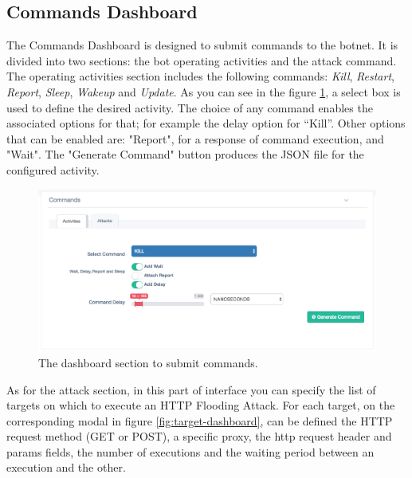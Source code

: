 \subsection{Commands Dashboard}\label{sec:commands-dashboard}
The Commands Dashboard is designed to submit commands to the botnet. It is divided into two sections: the bot operating activities and the attack command. The operating activities section includes the following commands: \textit{Kill}, \textit{Restart}, \textit{Report}, \textit{Sleep}, \textit{Wakeup} and \textit{Update}. As you can see in the figure \ref{fig:commands-dashboard}, a select box is used to define the desired activity. The choice of any command enables the associated options for that; for example the delay option for “Kill”. Other options that can be enabled are: "Report", for a response of command execution, and "Wait". The "Generate Command" button produces the JSON file for the configured activity.

\begin{figure}[tp]
  \centering
  \includegraphics[scale=0.45]{./fig/commandsWUI.png}
  \caption{The dashboard section to submit commands.}
    \label{fig:commands-dashboard}
\end{figure}

As for the attack section, in this part of interface you can specify the list of targets on which to execute an HTTP Flooding Attack. For each target, on the corresponding modal in figure \ref{fig:target-dashboard}, can be defined the HTTP request method (GET or POST), a specific proxy, the http request header and params fields, the number of executions and the waiting period between an execution and the other.

